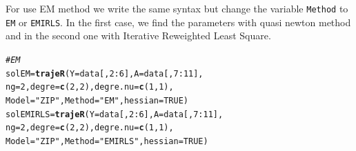 \documentclass{article}\usepackage[]{graphicx}\usepackage[]{color}
\makeatletter
\newcommand{\hlnum}[1]{\textcolor[rgb]{0.686,0.059,0.569}{#1}}%
\newcommand{\hlstr}[1]{\textcolor[rgb]{0.192,0.494,0.8}{#1}}%
\newcommand{\hlcom}[1]{\textcolor[rgb]{0.678,0.584,0.686}{\textit{#1}}}%
\newcommand{\hlopt}[1]{\textcolor[rgb]{0,0,0}{#1}}%
\newcommand{\hlstd}[1]{\textcolor[rgb]{0.345,0.345,0.345}{#1}}%
\newcommand{\hlkwb}[1]{\textcolor[rgb]{0.69,0.353,0.396}{#1}}%
\newcommand{\hlkwc}[1]{\textcolor[rgb]{0.333,0.667,0.333}{#1}}%
\newcommand{\hlkwd}[1]{\textcolor[rgb]{0.737,0.353,0.396}{\textbf{#1}}}%
\newenvironment{kframe}{%
 \def\at@end@of@kframe{}%
 \ifinner\ifhmode%
  \def\at@end@of@kframe{\end{minipage}}%
  \begin{minipage}{\columnwidth}%
 \fi\fi%
 \def\FrameCommand##1{\hskip\@totalleftmargin \hskip-\fboxsep
 \colorbox{shadecolor}{##1}\hskip-\fboxsep
     \hskip-\linewidth \hskip-\@totalleftmargin \hskip\columnwidth}%
 \MakeFramed {\advance\hsize-\width
   \@totalleftmargin\z@ \linewidth\hsize
   \@setminipage}}%
 {\par\unskip\endMakeFramed%
 \at@end@of@kframe}
\newenvironment{knitrout}{}{} %
\makeatother
\begin{document}
For use EM method we write the same syntax but change the variable \verb|Method| to \verb|EM| or \verb|EMIRLS|. In the first case, we find the parameters with quasi newton method and in the second one with Iterative Reweighted Least Square.
\begin{knitrout}
\color{fgcolor}\begin{kframe}
\begin{alltt}
\hlcom{# EM}
\hlstd{solEM} \hlkwb{=} \hlkwd{trajeR}\hlstd{(}\hlkwc{Y} \hlstd{= data[,}\hlnum{2}\hlopt{:}\hlnum{6}\hlstd{],} \hlkwc{A} \hlstd{= data[,}\hlnum{7}\hlopt{:}\hlnum{11}\hlstd{],}
               \hlkwc{ng} \hlstd{=} \hlnum{2}\hlstd{,} \hlkwc{degre}\hlstd{=}\hlkwd{c}\hlstd{(}\hlnum{2}\hlstd{,}\hlnum{2}\hlstd{),} \hlkwc{degre.nu} \hlstd{=} \hlkwd{c}\hlstd{(}\hlnum{1}\hlstd{,}\hlnum{1}\hlstd{),}
               \hlkwc{Model}\hlstd{=}\hlstr{"ZIP"}\hlstd{,} \hlkwc{Method} \hlstd{=} \hlstr{"EM"}\hlstd{,} \hlkwc{hessian} \hlstd{=} \hlnum{TRUE}\hlstd{)}
\hlstd{solEMIRLS} \hlkwb{=} \hlkwd{trajeR}\hlstd{(}\hlkwc{Y} \hlstd{= data[,}\hlnum{2}\hlopt{:}\hlnum{6}\hlstd{],} \hlkwc{A} \hlstd{= data[,}\hlnum{7}\hlopt{:}\hlnum{11}\hlstd{],}
                   \hlkwc{ng} \hlstd{=} \hlnum{2}\hlstd{,} \hlkwc{degre}\hlstd{=}\hlkwd{c}\hlstd{(}\hlnum{2}\hlstd{,}\hlnum{2}\hlstd{),} \hlkwc{degre.nu} \hlstd{=} \hlkwd{c}\hlstd{(}\hlnum{1}\hlstd{,}\hlnum{1}\hlstd{),}
                   \hlkwc{Model}\hlstd{=}\hlstr{"ZIP"}\hlstd{,} \hlkwc{Method} \hlstd{=} \hlstr{"EMIRLS"}\hlstd{,} \hlkwc{hessian} \hlstd{=} \hlnum{TRUE}\hlstd{)}
\end{alltt}
\end{kframe}
\end{knitrout}
\end{document}
